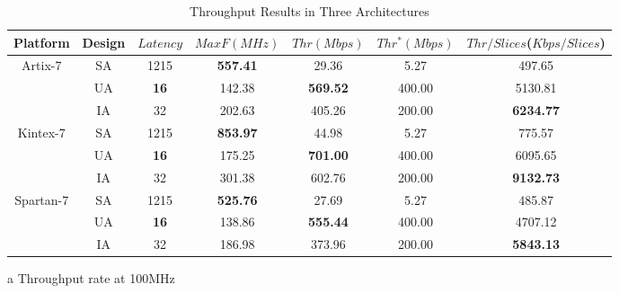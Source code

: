 \documentclass[final,5p,times,twocolumn]{elsarticle}
\begin{document}
\begin{table}
    \color{blue}
    \begin{threeparttable}
        \caption{Throughput Results in Three Architectures}\label{throughput_compare}%
        \begin{tabular*}{\textwidth}{@{\extracolsep\fill}|c|c|c|c|c|c|c|}
            \hline
            Platform & Design & $Latency$ & $MaxF(MHz)$ & $Thr(Mbps)$ & $Thr^*(Mbps)$\tnote{a} & $Thr/Slices$($Kbps/Slices$) \\
            \hline
            \multirow{3}{*}{Artix-7}  & SA & 1215 & \textbf{557.41} & 29.36 & 5.27 & 497.65 \\
            & UA & \textbf{16} & 142.38 & \textbf{569.52} & 400.00 & 5130.81 \\
            & IA & 32 & 202.63 & 405.26 & 200.00 & \textbf{6234.77} \\
            \hline
            \multirow{3}{*}{Kintex-7} & SA & 1215 & \textbf{853.97} & 44.98 & 5.27 & 775.57 \\
            & UA & \textbf{16} & 175.25 & \textbf{701.00} & 400.00 & 6095.65 \\
            & IA & 32 & 301.38 & 602.76 & 200.00 & \textbf{9132.73} \\
            \hline
            \multirow{3}{*}{Spartan-7} & SA & 1215 & \textbf{525.76} & 27.69 & 5.27 & 485.87 \\
            & UA & \textbf{16} & 138.86 & \textbf{555.44} & 400.00 & 4707.12 \\
            & IA & 32 & 186.98 & 373.96 & 200.00 & \textbf{5843.13} \\
            \hline
        \end{tabular*}
        \begin{tablenotes}
            \item[a] Throughput rate at 100MHz
        \end{tablenotes}
    \end{threeparttable}
\end{table}
\end{document}
